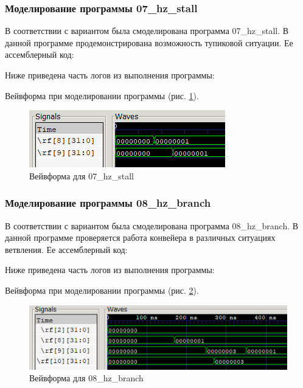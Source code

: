 \documentclass[a4paper,14pt]{article}
\begin{document}
	\subsubsection{Моделирование программы 07\_hz\_stall}
	
	В соответствии с вариантом была смоделирована программа  07\_hz\_stall.
	В данной программе продемонстрирована возможность тупиковой ситуации.
	Ее ассемблерный код:
	
	{\small {}}
	
	Ниже приведена часть логов из выполнения программы:
	
	{\small {}}
	
	Вейвформа при моделировании программы (рис. \ref{fig:0407wvf}).
	
	\begin{figure}[H]
		\centering
		\includegraphics[width=0.6\linewidth]{images/04_07_wvf}
		\caption{Вейвформа для  07\_hz\_stall}
		\label{fig:0407wvf}
	\end{figure}
	
	
	\subsubsection{Моделирование программы 08\_hz\_branch}
	
	В соответствии с вариантом была смоделирована программа 08\_hz\_branch.
	В данной программе проверяется работа конвейера в различных ситуациях ветвления.
	Ее ассемблерный код:
	
	{\small {}}
	
	Ниже приведена часть логов из выполнения программы:
	
	{\small {}}
	
	Вейвформа при моделировании программы (рис. \ref{fig:0408wvf}).
	
	\begin{figure}[H]
		\centering
		\includegraphics[width=0.95\linewidth]{images/04_08_wvf}
		\caption{Вейвформа для  08\_hz\_branch}
		\label{fig:0408wvf}
	\end{figure}
	
\end{document}
